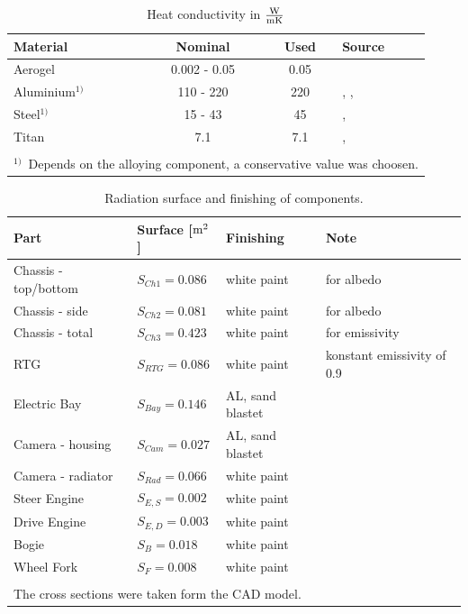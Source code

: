 \begin{table}[H]
	\centering
	\caption{Heat conductivity in $\frac{{\rm W}}{{\rm m} {\rm K}}$}
	\begin{tabular}{l@{\qquad\qquad}c@{\qquad\qquad}c@{\qquad\qquad}l}
		\toprule
		Material & Nominal & Used & Source \\ \midrule
		Aerogel & 0.002 - 0.05 & 0.05 & \cite{ref_tcs_03} \\
		Aluminium$^{1)}$  & 110 - 220 & 220 & \cite{ref_tcs_10}, \cite{ref_tcs_11}, \cite{ref_tcs_12} \\
		Steel$^{1)}$ & 15 - 43 & 45 & \cite{ref_tcs_08}, \cite{ref_tcs_09} \\ 
		Titan  & 7.1  & 7.1 & \cite{ref_tcs_06}, \cite{ref_tcs_07} \\\bottomrule
		&&&\\[-0.75em]
		\multicolumn{4}{l}{\small{$^{1)}$\  Depends on the alloying component, a conservative value was choosen.}}\\
	\end{tabular}
	\label{tab:tcs_conduct2}
\end{table}

\begin{table}[H]
	\centering
	\caption{Radiation surface and finishing of components.}
	\begin{tabular}{l@{\qquad}l@{\qquad}ll}
		\toprule
		Part  & Surface [${\rm m}^2$] & Finishing & Note \\ \midrule
		Chassis - top/bottom & $S_{Ch1}=0.086$ &  white paint & for albedo\\
		Chassis - side & $S_{Ch2}=0.081$ &  white paint & for albedo\\
		Chassis - total & $S_{Ch3}=0.423$ &  white paint & for emissivity\\
		RTG& $S_{RTG}=0.086$ & white paint & konstant emissivity of 0.9\\
		Electric Bay& $S_{Bay}=0.146$ & AL, sand blastet & \\
		Camera - housing & $S_{Cam}=0.027$ & AL, sand blastet &\\
		Camera - radiator & $S_{Rad}=0.066$ & white paint &  \\
		Steer Engine& $S_{E,S}=0.002$ & white paint& \\
		Drive Engine& $S_{E,D}=0.003$ &white paint & \\
		Bogie & $S_{B}=0.018$ &white paint & \\
		Wheel Fork& $S_{F}=0.008$ &white paint & \\ \bottomrule
		&&& \\
		\multicolumn{3}{l}{The cross sections were taken form the CAD model.}
	\end{tabular}
	\label{tab:tcs_surf}
\end{table}

